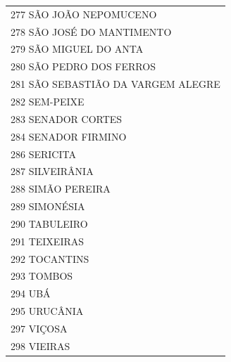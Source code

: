 \documentclass{article}
\begin{document}
\begin{longtable}[c]{m{18cm}}
\multicolumn{1}{l}{ \hspace{2em} 277 SÃO JOÃO NEPOMUCENO } \\
\multicolumn{1}{l}{ \hspace{2em} 278 SÃO JOSÉ DO MANTIMENTO } \\
\multicolumn{1}{l}{ \hspace{2em} 279 SÃO MIGUEL DO ANTA } \\
\multicolumn{1}{l}{ \hspace{2em} 280 SÃO PEDRO DOS FERROS } \\
\multicolumn{1}{l}{ \hspace{2em} 281 SÃO SEBASTIÃO DA VARGEM ALEGRE } \\
\multicolumn{1}{l}{ \hspace{2em} 282 SEM-PEIXE } \\
\multicolumn{1}{l}{ \hspace{2em} 283 SENADOR CORTES } \\
\multicolumn{1}{l}{ \hspace{2em} 284 SENADOR FIRMINO } \\
\multicolumn{1}{l}{ \hspace{2em} 286 SERICITA } \\
\multicolumn{1}{l}{ \hspace{2em} 287 SILVEIRÂNIA } \\
\multicolumn{1}{l}{ \hspace{2em} 288 SIMÃO PEREIRA } \\
\multicolumn{1}{l}{ \hspace{2em} 289 SIMONÉSIA } \\
\multicolumn{1}{l}{ \hspace{2em} 290 TABULEIRO } \\
\multicolumn{1}{l}{ \hspace{2em} 291 TEIXEIRAS } \\
\multicolumn{1}{l}{ \hspace{2em} 292 TOCANTINS } \\
\multicolumn{1}{l}{ \hspace{2em} 293 TOMBOS } \\
\multicolumn{1}{l}{ \hspace{2em} 294 UBÁ } \\
\multicolumn{1}{l}{ \hspace{2em} 295 URUCÂNIA } \\
\multicolumn{1}{l}{ \hspace{2em} 297 VIÇOSA } \\
\multicolumn{1}{l}{ \hspace{2em} 298 VIEIRAS } \\

\end{longtable}
\end{document}
